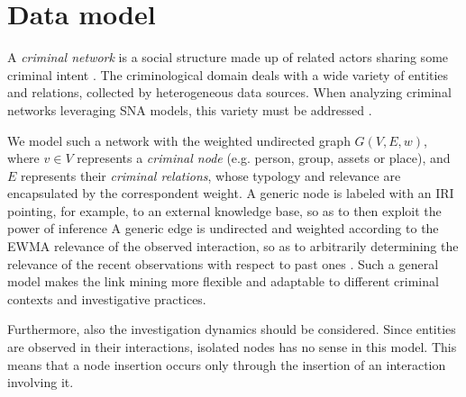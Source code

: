 \section{Data model}
\label{sec:data-model}

A \textit{criminal network} is a social structure made up of related actors sharing some criminal intent \cite{von2001organisierte}. 
The criminological domain deals with a wide variety of entities and relations, collected by heterogeneous data sources. 
When analyzing criminal networks leveraging SNA models, this variety must be addressed \cite{pramanik2016framework}.

We model such a network with the weighted undirected graph $G(V,E,w)$, where $v\in V$ represents a \textit{criminal node} (e.g. person, group, assets or place), and $E$ represents their \textit{criminal relations}, whose typology and relevance are encapsulated by the correspondent weight.
A generic node is labeled with an IRI pointing, for example, to an external knowledge base, so as to then exploit the power of inference
A generic edge is undirected and weighted according to the EWMA relevance of the observed interaction, so as to arbitrarily determining the relevance of the recent observations with respect to past ones \cite{lucas1990exponentially}. 
Such a general model makes the link mining more flexible and adaptable to different criminal contexts and investigative practices.

Furthermore, also the investigation dynamics should be considered. Since entities are observed in their interactions, isolated nodes has no sense in this model. This means that a node insertion occurs only through the insertion of an interaction involving it.

